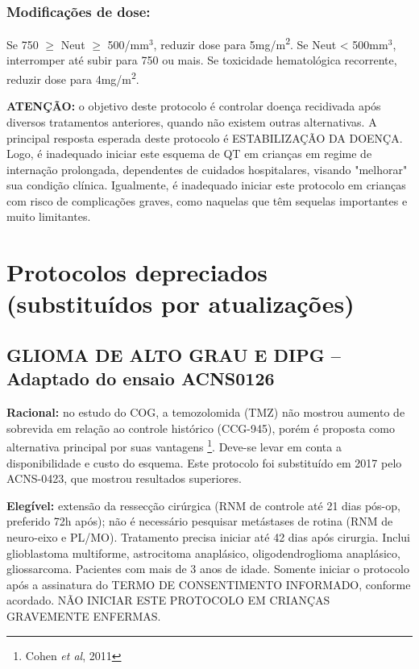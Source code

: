 \documentclass[11pt,a4paper,oldfontcommands]{memoir}
\begin{document}
\subsection{Modificações de dose:}
Se 750 $\geq$ Neut $\geq$ 500/mm\(^3\), reduzir dose para 5mg/m\textsuperscript{2}. Se Neut < 500mm\(^3\), interromper até subir para 750 ou mais. Se toxicidade hematológica recorrente, reduzir dose para 4mg/m\textsuperscript{2}.

\textbf{ATENÇÃO:} o objetivo deste protocolo é controlar doença recidivada após diversos tratamentos anteriores, quando não existem outras alternativas. A principal resposta esperada deste protocolo é ESTABILIZAÇÃO DA DOENÇA. Logo, é inadequado iniciar este esquema de QT em crianças em regime de internação prolongada, dependentes de cuidados hospitalares, visando "melhorar" sua condição clínica. Igualmente, é inadequado iniciar este protocolo em crianças com risco de complicações graves, como naquelas que têm sequelas importantes e muito limitantes.

\cleardoublepage
\chapter{Protocolos depreciados (substituídos por atualizações)}
\cleardoublepage
\section{GLIOMA DE ALTO GRAU E DIPG -- Adaptado do ensaio ACNS0126}
{\let\thefootnote\relax{}}
\textbf{Racional:} no estudo do COG, a temozolomida (TMZ) não mostrou aumento de sobrevida em relação ao controle histórico (CCG-945), porém é proposta como alternativa principal por suas vantagens \footnote{Cohen \textit{et al}, 2011}. Deve-se levar em conta a disponibilidade e custo do esquema. Este protocolo foi substituído em 2017 pelo ACNS-0423, que mostrou resultados superiores.

\textbf{Elegível:} extensão da ressecção cirúrgica (RNM de controle até 21 dias pós-op, preferido 72h após); não é necessário pesquisar metástases de rotina (RNM de neuro-eixo e PL/MO). Tratamento precisa iniciar até 42 dias após cirurgia. Inclui glioblastoma multiforme, astrocitoma anaplásico, oligodendroglioma anaplásico, gliossarcoma. Pacientes com mais de 3 anos de idade. Somente iniciar o protocolo após a assinatura do TERMO DE CONSENTIMENTO INFORMADO, conforme acordado. NÃO INICIAR ESTE PROTOCOLO EM CRIANÇAS GRAVEMENTE ENFERMAS.
\end{document}
